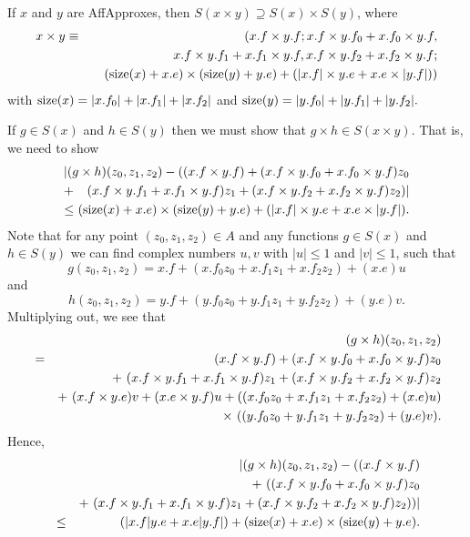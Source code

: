   If $x$ and $y$ are {\rm AffApproxes,}
 then $S(x \times y) \supseteq S(x) \times
S(y)${\rm ,} where
\begin{eqnarray*}
x \times y &\equiv& (x.f \times y.f; x.f \times y.f_0 + x.f_0 \times y.f, \\
&& \quad
x.f \times y.f_1 + x.f_1 \times y.f, x.f \times y.f_2 + x.f_2 \times y.f; 
\\
&& \quad
({\rm size}(x) + x.e) \times ({\rm size}(y) + y.e) + (|x.f| \times y.e + x.e \times |y.f|))
                                            \end{eqnarray*}
 with ${\rm size}(x) = |x.f_0| + |x.f_1| + |x.f_2|$ and ${\rm size}(y) = |y.f_0| + |y.f_1| + |y.f_2|.$
\endproclaim

  If $g \in S(x)$ and $h \in S(y)$ then we must show that $g\times h \in S(x \times y).$  That is, we need to show
\begin{eqnarray*}
&&\hskip-.25in |(g \times h)(z_0,z_1,z_2)   - 
((x.f \times y.f) + 
(x.f \times y.f_0 + x.f_0 \times y.f) z_0 \\
&\hskip-8pt+\hskip-8pt& (x.f \times y.f_1 + x.f_1 \times y.f) z_1 + (x.f \times y.f_2 + x.f_2 \times y.f) z_2)| 
\\
\le&\hskip-8pt\hskip-8pt&\hskip-16pt ({\rm size}(x) + x.e) \times ({\rm size}(y) + y.e) + (|x.f| \times y.e + x.e \times |y.f|).
\end{eqnarray*}
Note that for any point $(z_0, z_1, z_2) \in A$ and any functions $g \in S(x)$ and $h \in S(y)$ we can find complex numbers $u, v$ with
$|u| \le 1$ and $|v| \le 1$, such that
$$ g(z_0, z_1, z_2) = x.f + (x.f_0 z_0 + x.f_1 z_1 + x.f_2 z_2) + (x.e) u$$ and 
$$ h(z_0, z_1, z_2) = y.f + (y.f_0 z_0 + y.f_1 z_1 + y.f_2 z_2) + (y.e) v.$$
Multiplying out, we see that 
\begin{eqnarray*}
&&\hskip-36pt(g \times h) (z_0, z_1, z_2)\\
& = &
(x.f \times y.f) + 
(x.f \times y.f_0 + x.f_0 \times y.f) z_0\\
&& +\ (x.f \times y.f_1 + x.f_1 \times y.f) z_1 +
(x.f \times y.f_2 + x.f_2 \times y.f) z_2\\&& + \
(x.f \times y.e) v + (x.e \times y.f) u + 
((x.f_0 z_0 + x.f_1 z_1 + x.f_2 z_2) + (x.e) u)\\
&& \times\
((y.f_0 z_0 + y.f_1 z_1 + y.f_2 z_2) + (y.e) v).
                                              \end{eqnarray*}
Hence,
\begin{eqnarray*}
&&\hskip-48pt |(g \times h) (z_0, z_1, z_2) - ((x.f \times y.f) \\
& & + \
((x.f \times y.f_0 + x.f_0 \times y.f) z_0\\
&& +\ (x.f \times y.f_1 + x.f_1 \times y.f) z_1 +
(x.f \times y.f_2 + x.f_2 \times y.f) z_2))|
 \\
&\le& (|x.f| y.e + x.e |y.f|) + 
({\rm size}(x) + x.e) \times ({\rm size}(y) + y.e).\\
\noalign{\vskip-36pt}
\end{eqnarray*}
\enddemo

